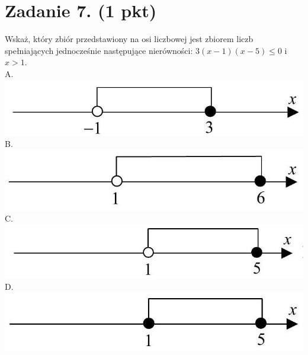 \documentclass[10pt]{article}
\begin{document}
\section*{Zadanie 7. (1 pkt)}
Wskaż, który zbiór przedstawiony na osi liczbowej jest zbiorem liczb spełniających jednocześnie następujące nierówności: \(3(x-1)(x-5) \leq 0\) i \(x>1\).\\
A.\\
\includegraphics[max width=\textwidth, center]{2024_11_21_5b6b7ffa9006e3f448adg-02(1)}\\
B.\\
\includegraphics[max width=\textwidth, center]{2024_11_21_5b6b7ffa9006e3f448adg-02(3)}\\
C.\\
\includegraphics[max width=\textwidth, center]{2024_11_21_5b6b7ffa9006e3f448adg-02(2)}\\
D.\\
\includegraphics[max width=\textwidth, center]{2024_11_21_5b6b7ffa9006e3f448adg-02}
\end{document}
